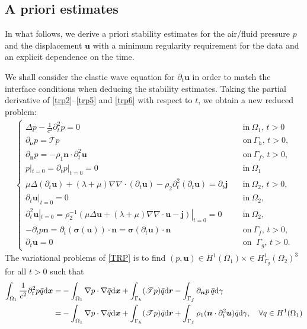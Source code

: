 \documentclass[final,leqno]{siamltex}
\begin{document}
\subsection{A priori estimates}

In what follows, we derive a priori stability estimates for the  air/fluid
pressure $p$ and the displacement $\boldsymbol u$ with a minimum regularity
requirement for the data and an explicit dependence on the time.

We shall consider the elastic wave equation for  $\partial_t \boldsymbol u$ in
order to match the interface conditions when deducing the stability estimates.
Taking the partial derivative  of \eqref{trp2}--\eqref{trp5} and \eqref{trp6}
with respect to $t$, we obtain a new reduced problem:
\begin{align}\label{TRP}
 \begin{cases}
 \Delta p  - \frac{1}{c^2 } \partial_t^2  p =0 \quad
&\text{in}~\Omega_1,\,t>0\\
  \partial_{\boldsymbol \nu} p= \mathscr T p \quad  &\text
{on}~\Gamma_h,\,t>0,\\
 \partial_{\boldsymbol n} p=-\rho_1 \boldsymbol n
\cdot\partial_t^2 \boldsymbol u \quad & \text {on}~\Gamma_f,\,t>0,\\
  p|_{t=0}=\partial_t p|_{t=0}=0\quad & \text {in}~\Omega_1 \\
  \mu \Delta (\partial_t \boldsymbol u) +  (\lambda+\mu) \nabla \nabla \cdot
(\partial_t\boldsymbol u) -\rho_2  \partial_t^2 (\partial_t \boldsymbol u) =
\partial_t\boldsymbol j \quad  & \text {in}~  \Omega_2,\,t>0,\\
  \partial_t \boldsymbol u|_{t=0}=0\quad & \text {in}~\Omega_2,\\
 \partial_{t}^2 \boldsymbol u|_{t=0}= \rho_2^{-1 } \left(
  \mu \Delta \boldsymbol u + (\lambda+\mu) \nabla \nabla \cdot \boldsymbol u
-\boldsymbol j  \right)|_{t=0}=0 \quad & \text {in}~ \Omega_2,\\
   -\partial_t p \boldsymbol n = \partial_t (\boldsymbol \sigma (\boldsymbol
u)) \cdot \boldsymbol n  = \boldsymbol \sigma (\partial_t \boldsymbol u) \cdot
\boldsymbol n \quad &\text {on}~\Gamma_f,\,t>0,\\
  \partial_t \boldsymbol u =0 \quad & \text {on }~\Gamma_g,\,t>0.
 \end{cases}
 \end{align}
The variational problems of \eqref{TRP} is to find $(p, \boldsymbol u) \in
H^1(\Omega_1) \times   \in H^1_{\Gamma_g} (\Omega_2)^3$ for all $t>0$ such that
\begin{align}
 \int_{\Omega_1} \frac{1}{c^2}
 \partial_t^2 p \bar q {\rm d} \boldsymbol  x
 =&-\int_{\Omega_1} \nabla p \cdot \nabla \bar q {\rm d} \boldsymbol  x
+\int_{\Gamma_h} (\mathscr T p) \bar q {\rm d} \boldsymbol r
 -\int_{\Gamma_f} \partial_{\boldsymbol n} p\, \bar q {\rm d}
\gamma \nonumber\\
 =&-\int_{\Omega_1} \nabla p \cdot \nabla \bar q {\rm d} \boldsymbol  x
 +\int_{\Gamma_h} (\mathscr T p) \bar q {\rm d} \boldsymbol r +\int_{\Gamma_f}
\rho_1 (\boldsymbol n \cdot \partial_t^2 \boldsymbol u) \bar {q} {\rm d}\gamma,
\quad \forall q \in H^1 (\Omega_1) \label{v1}
\end{align}
\end{document}
